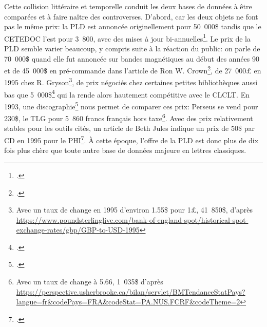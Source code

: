 Cette collision littéraire et temporelle conduit les deux bases de données à être comparées et à faire naître des controverses. D'abord, car les deux objets ne font pas le même prix: la PLD est annoncée originellement pour 50~000\$ tandis que le CETEDOC l'est pour 3~800, avec des mises à jour bi-annuelles\footcite{bucknall_review_1994}. Le prix de la PLD semble varier beaucoup, y compris suite à la réaction du public: on parle de 70~000\$ quand elle fut annoncée sur bandes magnétiques au début des années 90 et de 45~000\$ en pré-commande dans l'article de Ron W. Crown\footcite{crown_comparing_2000}, de 27~000£ en 1995 chez R. Gryson\footnote{Avec un taux de change en 1995 d'environ 1.55\$ pour 1£, 41~850\$, d'après \url{https://www.poundsterlinglive.com/bank-of-england-spot/historical-spot-exchange-rates/gbp/GBP-to-USD-1995}}, de prix négociés chez certaines petites bibliothèques aussi bas que 5~000\$\footcite[Note 10, p.~108]{crown_comparing_2000} qui la rende alors hautement compétitive avec le CLCLT. En 1993, une discographie\footcite{pellen_les_1993} nous permet de comparer ces prix: Perseus se vend pour 230\$, le TLG pour 5~860 francs français hors taxe\footnote{Avec un taux de change à 5.66, 1~035\$ d'après \url{https://perspective.usherbrooke.ca/bilan/servlet/BMTendanceStatPays?langue=fr&codePays=FRA&codeStat=PA.NUS.FCRF&codeTheme=2}}. Avec des prix relativement stables pour les outils cités, un article de Beth Jules indique un prix de 50\$ par CD en 1995 pour le PHI\footcite{juhl_ex_1995}. À cette époque, l'offre de la PLD est donc plus de dix fois plus chère que toute autre base de données majeure en lettres classiques.

